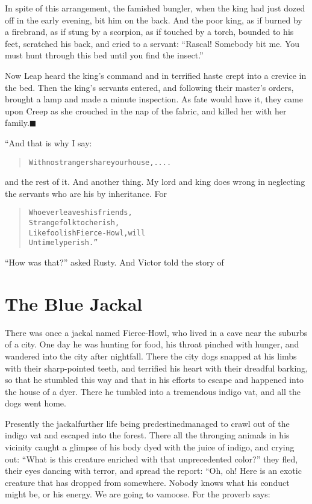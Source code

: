 \documentclass[article, twoside, 14pt]{memoir}
\newcommand{\qed}{\hfill \ensuremath{\blacksquare}}
\renewenvironment{verbatim}{%
\begin{quote}%
\vskip -10pt%
\begin{alltt}\normalfont\large}{\end{alltt}%
\end{quote}%
\vskip -10pt
} %
\begin{document}
In spite of this arrangement, the famished bungler, when the king
had just dozed off in the early evening, bit him on the back. And
the poor king, as if burned by a firebrand, as if stung by a
scorpion, as if touched by a torch, bounded to his feet,
scratched his back, and cried to a servant:
``Rascal! Somebody bit me. You must hunt through this bed until you find the insect.''

Now Leap heard the king's command and in terrified haste crept into
a crevice in the bed. Then the king's servants entered, and
following their master's orders, brought a lamp and made a minute
inspection. As fate would have it, they came upon Creep as she
crouched in the nap of the fabric, and killed her with her
family.\hyperref[s13]{\qed}

“And that is why I say:

\begin{verbatim}
With no stranger share your house, ....
\end{verbatim}
and the rest of it. And another thing. My lord and king does wrong
in neglecting the servants who are his by inheritance. For

\begin{verbatim}
Whoever leaves his friends,
    Strange folk to cherish,
Like foolish Fierce-Howl, will
    Untimely perish.”
\end{verbatim}
``How was that?'' asked Rusty. And Victor told the story of

\chapter{The Blue Jackal}

\label{s14}

There was once a jackal named Fierce-Howl, who lived in a cave near
the suburbs of a city. One day he was hunting for food, his throat
pinched with hunger, and wandered into the city after nightfall.
There the city dogs snapped at his limbs with their sharp-pointed
teeth, and terrified his heart with their dreadful barking, so that
he stumbled this way and that in his efforts to escape and happened
into the house of a dyer. There he tumbled into a tremendous indigo
vat, and all the dogs went home.

Presently the jackal{\textemdash}further life being predestined{\textemdash}managed to
crawl out of the indigo vat and escaped into the forest. There all
the thronging animals in his vicinity caught a glimpse of his body
dyed with the juice of indigo, and crying out:
``What is this creature enriched with that unprecedented color?''
they fled, their eyes dancing with terror, and spread the report:
“Oh, oh! Here is an exotic creature that has dropped from
somewhere. Nobody knows what his conduct might be, or his
energy. We are going to vamoose. For the proverb says:
\end{document}
